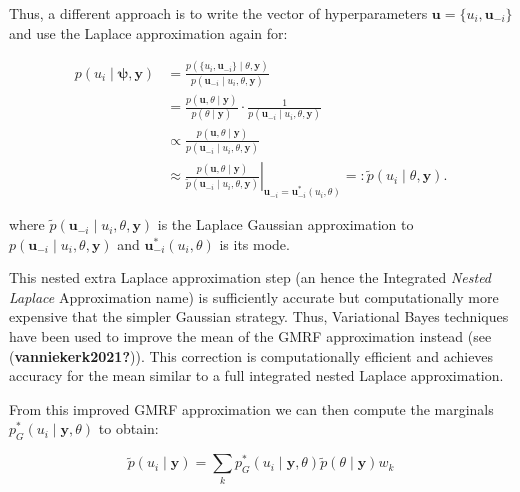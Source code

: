 \documentclass[
  letterpaper,
  DIV=11,
  numbers=noendperiod]{scrartcl}
\begin{document}
Thus, a different approach is to write the vector of hyperparameters
\(\mathbf{u} = \{u_i,\mathbf{u}_{-i}\}\) and use the Laplace
approximation again for:

\[
\begin{aligned}
p(u_i \mid \boldsymbol{\psi}, \mathbf{y}) &= \frac{p(\{u_i,\mathbf{u}_{-i}\} \mid \theta, \mathbf{y})}{p(\mathbf{u}_{-i}\mid u_i, \theta, \mathbf{y})} \\
&= \frac{p(\mathbf{u}, \theta \mid \mathbf{y})}{p(\theta \mid \mathbf{y})} \cdot \frac{1}{p(\mathbf{u}_{-i} \mid u_i, \theta, \mathbf{y})}\\
&\propto \frac{p(\mathbf{u}, \theta \mid \mathbf{y})}{p(\mathbf{u}_{-i} \mid u_i, \theta, \mathbf{y})} \\
&\left.\approx \frac{p(\mathbf{u}, \theta \mid \mathbf{y})}{\widetilde{p}(\mathbf{u}_{-i} \mid u_i, \theta, \mathbf{y})} \right|_{\mathbf{u}_{-i}=\mathbf{u}^*_{-i}(u_i,\theta)}=:\tilde{p}(u_i\mid\theta,\mathbf{y}).
\end{aligned}
\]

where \(\widetilde{p}(\mathbf{u}_{-i} \mid u_i, \theta, \mathbf{y})\) is
the Laplace Gaussian approximation to
\(p(\mathbf{u}_{-i} \mid u_i, \theta, \mathbf{y})\) and
\(\mathbf{u}_{-i}^*(u_i, \theta)\) is its mode.

This nested extra Laplace approximation step (an hence the Integrated
\emph{Nested Laplace} Approximation name) is sufficiently accurate but
computationally more expensive that the simpler Gaussian strategy. Thus,
Variational Bayes techniques have been used to improve the mean of the
GMRF approximation instead (see (\textbf{vanniekerk2021?})). This
correction is computationally efficient and achieves accuracy for the
mean similar to a full integrated nested Laplace approximation.

From this improved GMRF approximation we can then compute the marginals
\(p_G^*(u_i \mid \mathbf{y},\theta)\) to obtain:

\[
\tilde{p}(u_i\mid\mathbf{y}) = \sum_k p_G^*(u_i \mid \mathbf{y},\theta) \tilde{p}(\theta\mid\mathbf{y})w_k
\]
\end{document}
